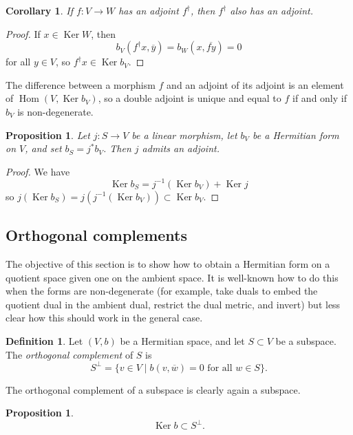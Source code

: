 \documentclass[10pt,a4paper]{amsart}
\newtheorem{prop}[theo]{Proposition}
\newtheorem{coro}[theo]{Corollary}
\theoremstyle{definition}
\newtheorem{defi}[theo]{Definition}
\def\ov#1{\overline{#1}}
\DeclareMathOperator{\Ker}{Ker}
\DeclareMathOperator{\Hom}{Hom}
\begin{document}
\begin{coro}
If $f : V \to W$ has an adjoint $f^\dagger$, then $f^\dagger$ also has an adjoint.
\end{coro}

\begin{proof}
If $x \in \Ker W$, then
\[
b_V(f^\dagger x, \ov y)
= b_W(x, \ov{fy})
= 0
\]
for all $y \in V$, so $f^\dagger x \in \Ker b_V$.
\end{proof}

The difference between a morphism $f$ and an adjoint of its adjoint is an element of $\Hom(V, \Ker b_V)$, so a double adjoint is unique and equal to $f$ if and only if $b_V$ is non-degenerate.


\begin{prop}
Let $j : S \to V$ be a linear morphism, let $b_V$ be a Hermitian form on $V$, and set $b_S = j^*b_V$. Then $j$ admits an adjoint.
\end{prop}

\begin{proof}
We have
\[
\Ker b_S = j^{-1}(\Ker b_V) + \Ker j
\]
so $j(\Ker b_S) = j(j^{-1}(\Ker b_V)) \subset \Ker b_V$.
\end{proof}






\subsection*{Orthogonal complements}


The objective of this section is to show how to obtain a Hermitian form on a quotient space given one on the ambient space. It is well-known how to do this when the forms are non-degenerate (for example, take duals to embed the quotient dual in the ambient dual, restrict the dual metric, and invert) but less clear how this should work in the general case.


\begin{defi}
Let $(V,b)$ be a Hermitian space, and let $S \subset V$ be a subspace. The \emph{orthogonal complement} of $S$ is
\[
S^\perp = \{ v \in V \mid b(v, \ov w) = 0 \text{ for all $w \in S$}\}.
\]
\end{defi}

The orthogonal complement of a subspace is clearly again a subspace.

\begin{prop}
\[
\Ker b \subset S^\perp.
\]
\end{prop}
\end{document}
